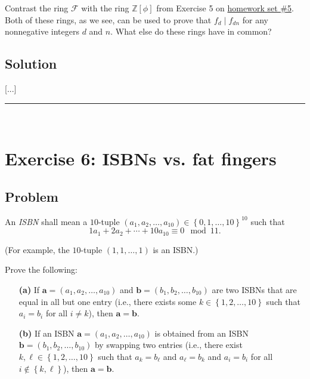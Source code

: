 \documentclass[paper=a4, fontsize=12pt]{scrartcl} %
\newcommand{\ZZ}{\mathbb{Z}} %
\newcommand{\set}[1]{\left\{ #1 \right\}}
\newcommand{\tup}[1]{\left( #1 \right)}
\newcommand{\ive}[1]{\left[ #1 \right]}
\newcommand{\calF}{\mathcal{F}}
\newcommand{\horrule}[1]{\rule{\linewidth}{#1}} %
\theoremstyle{plainsl}
\theoremstyle{definition}
\theoremstyle{remark}
\begin{document}
Contrast the ring $\calF$ with the ring $\ZZ\ive{\phi}$
from Exercise 5 on
\href{http://www.cip.ifi.lmu.de/~grinberg/t/19s/hw5s.pdf}{homework set \#5}.
Both of these rings, as we see, can be used to prove that $f_d \mid f_{dn}$
for any nonnegative integers $d$ and $n$.
What else do these rings have in common?

\subsection{Solution}

[...]

\horrule{0.3pt} \\[0.4cm]

\section{Exercise 6: ISBNs vs. fat fingers}

\subsection{Problem}

An \textit{ISBN} shall mean a $10$-tuple
$\tup{a_1, a_2, \ldots, a_{10}} \in \set{0, 1, \ldots, 10}^{10}$
such that
\[
1 a_1 + 2 a_2 + \cdots + 10 a_{10} \equiv 0 \mod 11 .
\]

\noindent
(For example, the $10$-tuple $\tup{1, 1, \ldots, 1}$ is an ISBN.)

Prove the following:

\begin{enumerate}

\item[\textbf{(a)}]
If $\mathbf{a} = \tup{a_1, a_2, \ldots, a_{10}}$ and
$\mathbf{b} = \tup{b_1, b_2, \ldots, b_{10}}$ are two ISBNs
that are equal in all but one entry (i.e.,
there exists some $k \in \set{1, 2, \ldots, 10}$
such that $a_i = b_i$ for all $i \neq k$),
then $\mathbf{a} = \mathbf{b}$.

\item[\textbf{(b)}]
If an ISBN $\mathbf{a} = \tup{a_1, a_2, \ldots, a_{10}}$ is
obtained from an ISBN
$\mathbf{b} = \tup{b_1, b_2, \ldots, b_{10}}$ by swapping
two entries (i.e., there exist $k, \ell \in \set{1, 2, \ldots, 10}$
such that $a_k = b_\ell$ and $a_\ell = b_k$ and
$a_i = b_i$ for all $i \notin \set{k, \ell}$),
then $\mathbf{a} = \mathbf{b}$.

\end{enumerate}
\end{document}
